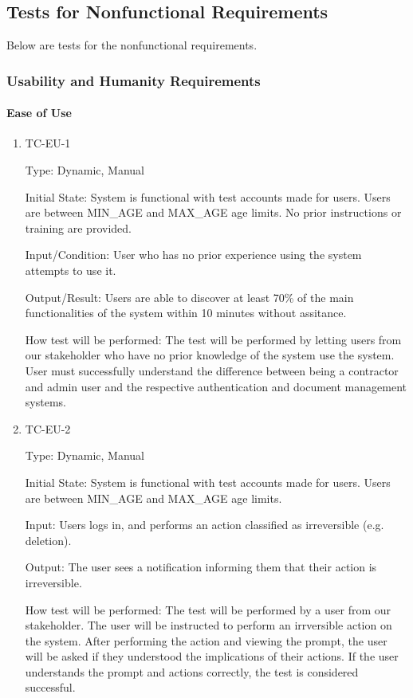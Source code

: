 \documentclass[12pt, titlepage]{article}
\begin{document}
\subsection{Tests for Nonfunctional Requirements}

Below are tests for the nonfunctional requirements.

\subsubsection{Usability and Humanity Requirements}

\paragraph{Ease of Use}

\begin{enumerate}

  \item{TC-EU-1\\}

    Type: Dynamic, Manual

    Initial State: System is functional with test accounts made for users. Users
    are between MIN\_AGE and MAX\_AGE age limits. No prior instructions or
    training are provided.

    Input/Condition: User who has no prior experience using the system attempts
    to use it.

    Output/Result: Users are able to discover at least 70\% of the main
    functionalities of the system within 10 minutes without assitance.

    How test will be performed: The test will be performed by letting users from
    our stakeholder who have no prior knowledge of the system use the system.
    User must successfully understand the difference between being a contractor and admin user 
    and the respective authentication and document management systems.\\

  \item{TC-EU-2\\}

    Type: Dynamic, Manual

    Initial State: System is functional with test accounts made for users. Users
    are between MIN\_AGE and MAX\_AGE age limits.

    Input: Users logs in, and performs an action classified as irreversible
    (e.g. deletion).

    Output: The user sees a notification informing them that their action is
    irreversible.

    How test will be performed: The test will be performed by a user from our
    stakeholder. The user will be instructed to perform an irrversible action on
    the system. After performing the action and viewing the prompt, the user
    will be asked if they understood the implications of their actions. If the
    user understands the prompt and actions correctly, the test is considered
    successful.

\end{enumerate}
\end{document}
